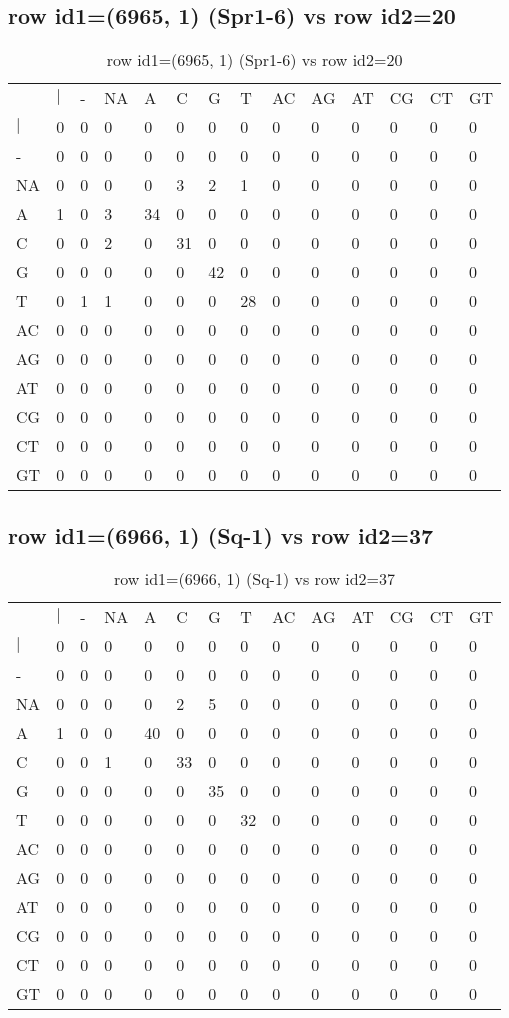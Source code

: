 \subsection{row id1=(6965, 1) (Spr1-6) vs row id2=20}
\begin{center}
\begin{longtable}{|l|l|l|l|l|l|l|l|l|l|l|l|l|l|}
\caption{row id1=(6965, 1) (Spr1-6) vs row id2=20} \label{table_dm178}\\
\hline
\\
\hline
&$|$&-&NA&A&C&G&T&AC&AG&AT&CG&CT&GT\\
$|$&0&0&0&0&0&0&0&0&0&0&0&0&0\\
-&0&0&0&0&0&0&0&0&0&0&0&0&0\\
NA&0&0&0&0&3&2&1&0&0&0&0&0&0\\
A&1&0&3&34&0&0&0&0&0&0&0&0&0\\
C&0&0&2&0&31&0&0&0&0&0&0&0&0\\
G&0&0&0&0&0&42&0&0&0&0&0&0&0\\
T&0&1&1&0&0&0&28&0&0&0&0&0&0\\
AC&0&0&0&0&0&0&0&0&0&0&0&0&0\\
AG&0&0&0&0&0&0&0&0&0&0&0&0&0\\
AT&0&0&0&0&0&0&0&0&0&0&0&0&0\\
CG&0&0&0&0&0&0&0&0&0&0&0&0&0\\
CT&0&0&0&0&0&0&0&0&0&0&0&0&0\\
GT&0&0&0&0&0&0&0&0&0&0&0&0&0\\
\hline
\end{longtable}
\end{center}

\subsection{row id1=(6966, 1) (Sq-1) vs row id2=37}
\begin{center}
\begin{longtable}{|l|l|l|l|l|l|l|l|l|l|l|l|l|l|}
\caption{row id1=(6966, 1) (Sq-1) vs row id2=37} \label{table_dm180}\\
\hline
\\
\hline
&$|$&-&NA&A&C&G&T&AC&AG&AT&CG&CT&GT\\
$|$&0&0&0&0&0&0&0&0&0&0&0&0&0\\
-&0&0&0&0&0&0&0&0&0&0&0&0&0\\
NA&0&0&0&0&2&5&0&0&0&0&0&0&0\\
A&1&0&0&40&0&0&0&0&0&0&0&0&0\\
C&0&0&1&0&33&0&0&0&0&0&0&0&0\\
G&0&0&0&0&0&35&0&0&0&0&0&0&0\\
T&0&0&0&0&0&0&32&0&0&0&0&0&0\\
AC&0&0&0&0&0&0&0&0&0&0&0&0&0\\
AG&0&0&0&0&0&0&0&0&0&0&0&0&0\\
AT&0&0&0&0&0&0&0&0&0&0&0&0&0\\
CG&0&0&0&0&0&0&0&0&0&0&0&0&0\\
CT&0&0&0&0&0&0&0&0&0&0&0&0&0\\
GT&0&0&0&0&0&0&0&0&0&0&0&0&0\\
\hline
\end{longtable}
\end{center}

